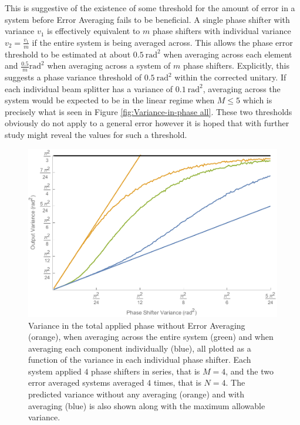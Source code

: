 \documentclass[aps,pra,twocolumn,superscriptaddress,numerical,floatfix]{revtex4-1}
\begin{document}
This is suggestive of the existence of some threshold for the amount of error in a system before Error Averaging fails to be beneficial. A single phase shifter with variance $v_{1}$ is effectively equivalent to $m$ phase shifters with individual variance $v_{2}=\frac{v_{1}}{m}$ if the entire system is being averaged across. This allows the phase error threshold to be estimated at about $0.5\ \textrm{rad}^{2}$ when averaging across each element and $\frac{0.5}{m}\textrm{rad}^{2}$ when averaging across a system of $m$ phase shifters. Explicitly, this suggests a phase variance threshold of $0.5\ \textrm{rad}^{2}$ within the corrected unitary. If each individual beam splitter has a variance of $0.1\ \textrm{rad}^{2}$, averaging across the system would be expected to be in the linear regime when $M\le5$ which is precisely what is seen in Figure \ref{fig:Variance-in-phase all}. These two thresholds obviously do not apply to a general error however it is hoped that with further study might reveal the values for such a threshold.
\begin{figure}
\centerline{\includegraphics[width=\columnwidth]{variancevariance.pdf}}
\caption{Variance in the total applied phase without Error Averaging (orange), when averaging across the entire system (green) and when averaging each component individually (blue), all plotted as a function of the variance in each individual phase shifter. Each system applied $4$ phase shifters in series, that is $M=4$, and the two error averaged systems averaged $4$ times, that is $N=4$. The predicted variance without any averaging (orange) and with averaging (blue) is also shown along with the maximum allowable variance. \label{fig:Variance(veriance)}}
\end{figure}
\end{document}
